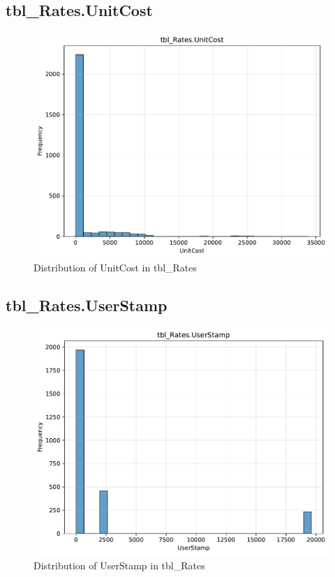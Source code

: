 \subsection{tbl\_Rates.UnitCost}

\begin{figure}[htbp]
\centering
\includegraphics[width=\textwidth]{figures/dbo_tbl_Rates_UnitCost.pdf}
\caption{Distribution of UnitCost in tbl\_Rates}
\end{figure}\newpage

\subsection{tbl\_Rates.UserStamp}

\begin{figure}[htbp]
\centering
\includegraphics[width=\textwidth]{figures/dbo_tbl_Rates_UserStamp.pdf}
\caption{Distribution of UserStamp in tbl\_Rates}
\end{figure}\newpage

